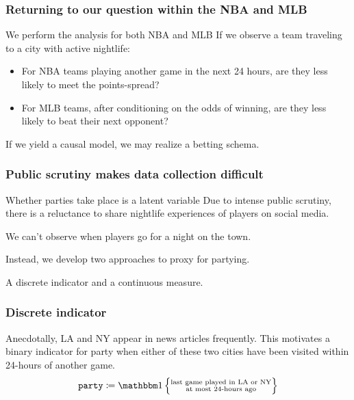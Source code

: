 \documentclass{beamer}
\begin{document}

\begin{frame}   \frametitle{Returning to our question within the NBA and MLB}
  \begin{block}{We perform the analysis for both NBA and MLB}     
    If we observe a team traveling to a city with active nightlife:
    \vspace{12pt}
    \begin{itemize}       \item For NBA teams playing another game in the next 24 hours, are they less likely to meet the points-spread?
      \item For MLB teams, after conditioning on the odds of winning, are they less likely to beat their next opponent?     \end{itemize}
    \vspace{12pt}\begin{block}{If we yield a causal model, we may realize a betting schema.}
\end{block}
  \end{block} 
\end{frame}

\begin{frame}   \frametitle{Public scrutiny makes data collection difficult}

  \begin{block}{Whether parties take place is a latent variable}     Due to intense public scrutiny, there is a reluctance to share nightlife experiences
    of players on social media.

  \end{block} 
  \vspace{12pt}
  \begin{block}{We can't observe when players go for a night on the town.}
    
    Instead, we develop two approaches to proxy for partying. 

    A discrete indicator and a continuous measure.
  \end{block} \end{frame}

\begin{frame}   \frametitle{Discrete indicator}
  \begin{block}{Anecdotally, LA and NY appear in news articles frequently.}     \vspace{12pt}This motivates a binary indicator for party when either of these two cities have been visited within 24-hours of another game.
\vspace{12pt}
    \[
      \texttt{party} \coloneqq \mathbbm 1 \left \{\substack{\textrm{last game played in LA or NY} \\ \textrm{at most 24-hours ago}}\right \}
    \]   \end{block} 
\end{frame}
\end{document}
